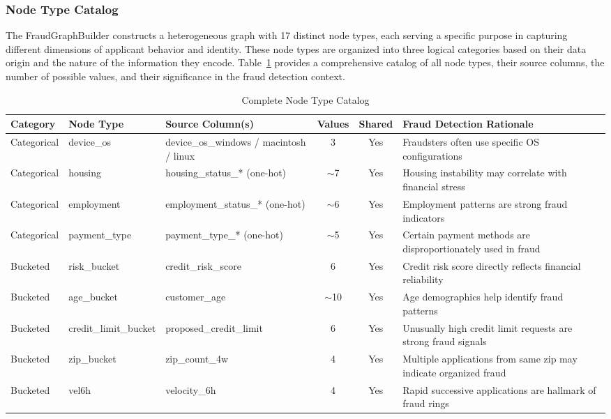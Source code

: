 \subsubsection{Node Type Catalog}

The FraudGraphBuilder constructs a heterogeneous graph with 17 distinct node types, each serving a specific purpose in capturing different dimensions of applicant behavior and identity. These node types are organized into three logical categories based on their data origin and the nature of the information they encode. Table~\ref{tab:ch4-nodetypes} provides a comprehensive catalog of all node types, their source columns, the number of possible values, and their significance in the fraud detection context.

\begin{table}[H]
\centering
\caption{Complete Node Type Catalog}
\label{tab:ch4-nodetypes}
\footnotesize
\setlength{\tabcolsep}{4pt}
\begin{tabularx}{\textwidth}{llXccX}
\toprule
\textbf{Category} & \textbf{Node Type} & \textbf{Source Column(s)} & \textbf{Values} & \textbf{Shared} & \textbf{Fraud Detection Rationale} \\
\midrule
Categorical & device\_os & device\_os\_windows / macintosh / linux & 3 & Yes & Fraudsters often use specific OS configurations \\
Categorical & housing & housing\_status\_* (one-hot) & $\sim$7 & Yes & Housing instability may correlate with financial stress \\
Categorical & employment & employment\_status\_* (one-hot) & $\sim$6 & Yes & Employment patterns are strong fraud indicators \\
Categorical & payment\_type & payment\_type\_* (one-hot) & $\sim$5 & Yes & Certain payment methods are disproportionately used in fraud \\
\midrule
Bucketed & risk\_bucket & credit\_risk\_score & 6 & Yes & Credit risk score directly reflects financial reliability \\
Bucketed & age\_bucket & customer\_age & $\sim$10 & Yes & Age demographics help identify fraud patterns \\
Bucketed & credit\_limit\_bucket & proposed\_credit\_limit & 6 & Yes & Unusually high credit limit requests are strong fraud signals \\
Bucketed & zip\_bucket & zip\_count\_4w & 4 & Yes & Multiple applications from same zip may indicate organized fraud \\
Bucketed & vel6h & velocity\_6h & 4 & Yes & Rapid successive applications are hallmark of fraud rings \\

\end{tabularx}
\end{table}
